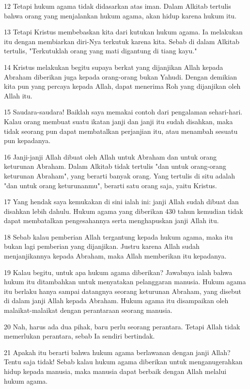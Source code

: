 \par 12 Tetapi hukum agama tidak didasarkan atas iman. Dalam Alkitab tertulis bahwa orang yang menjalankan hukum agama, akan hidup karena hukum itu.
\par 13 Tetapi Kristus membebaskan kita dari kutukan hukum agama. Ia melakukan itu dengan membiarkan diri-Nya terkutuk karena kita. Sebab di dalam Alkitab tertulis, "Terkutuklah orang yang mati digantung di tiang kayu."
\par 14 Kristus melakukan begitu supaya berkat yang dijanjikan Allah kepada Abraham diberikan juga kepada orang-orang bukan Yahudi. Dengan demikian kita pun yang percaya kepada Allah, dapat menerima Roh yang dijanjikan oleh Allah itu.
\par 15 Saudara-saudara! Baiklah saya memakai contoh dari pengalaman sehari-hari. Kalau orang membuat suatu ikatan janji dan janji itu sudah disahkan, maka tidak seorang pun dapat membatalkan perjanjian itu, atau menambah sesuatu pun kepadanya.
\par 16 Janji-janji Allah dibuat oleh Allah untuk Abraham dan untuk orang keturunan Abraham. Dalam Alkitab tidak tertulis "dan untuk orang-orang keturunan Abraham", yang berarti banyak orang. Yang tertulis di situ adalah "dan untuk orang keturunanmu", berarti satu orang saja, yaitu Kristus.
\par 17 Yang hendak saya kemukakan di sini ialah ini: janji Allah sudah dibuat dan disahkan lebih dahulu. Hukum agama yang diberikan 430 tahun kemudian tidak dapat membatalkan pengesahannya serta menghapuskan janji Allah itu.
\par 18 Sebab kalau pemberian Allah tergantung kepada hukum agama, maka itu bukan lagi pemberian yang dijanjikan. Justru karena Allah sudah menjanjikannya kepada Abraham, maka Allah memberikan itu kepadanya.
\par 19 Kalau begitu, untuk apa hukum agama diberikan? Jawabnya ialah bahwa hukum itu ditambahkan untuk menyatakan pelanggaran manusia. Hukum agama itu berlaku hanya sampai datangnya seorang keturunan Abraham, yang disebut di dalam janji Allah kepada Abraham. Hukum agama itu disampaikan oleh malaikat-malaikat dengan perantaraan seorang manusia.
\par 20 Nah, harus ada dua pihak, baru perlu seorang perantara. Tetapi Allah tidak memerlukan perantara, sebab Ia sendiri bertindak.
\par 21 Apakah itu berarti bahwa hukum agama berlawanan dengan janji Allah? Tentu saja tidak! Sebab kalau hukum agama diberikan untuk menganugerahkan hidup kepada manusia, maka manusia dapat berbaik dengan Allah melalui hukum agama.
